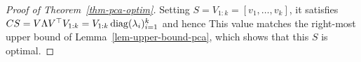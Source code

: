 \begin{proof}[Proof of Theorem~\ref{thm-pca-optim}]
	Setting $S=V_{1:k}=[v_1,\ldots,v_k]$, it satisfies $CS = V \Lambda V^\top V_{1:k} = V_{1:k} \operatorname{diag}(\lambda_i)_{i=1}^k$ and hence
	This value matches the right-most upper bound of Lemma~\ref{lem-upper-bound-pca}, which shows that this $S$ is optimal.
\end{proof}


